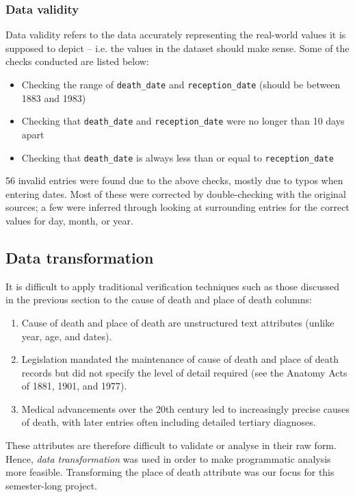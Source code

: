 \subsubsection{Data validity}

Data validity refers to the data accurately representing the real-world values it is supposed to depict -- i.e. the values in the dataset should make sense. Some of the checks conducted are listed below:
\begin{itemize}
    \item Checking the range of \texttt{death\_date} and \texttt{reception\_date} (should be between 1883 and 1983)
    \item Checking that \texttt{death\_date} and \texttt{reception\_date} were no longer than 10 days apart
    \item Checking that \texttt{death\_date} is always less than or equal to \texttt{reception\_date}
\end{itemize}

56 invalid entries were found due to the above checks, mostly due to typos when entering dates. Most of these were corrected by double-checking with the original sources; a few were inferred through looking at surrounding entries for the correct values for day, month, or year.

\subsection{Data transformation}

It is difficult to apply traditional verification techniques such as those discussed in the previous section to the cause of death and place of death columns:

\begin{enumerate}
\item Cause of death and place of death are unstructured text attributes (unlike year, age, and dates).
\item Legislation mandated the maintenance of cause of death and place of death records but did not specify the level of detail required (see the Anatomy Acts of 1881, 1901, and 1977).
\item Medical advancements over the 20th century led to increasingly precise causes of death, with later entries often including detailed tertiary diagnoses.
\end{enumerate}

These attributes are therefore difficult to validate or analyse in their raw form. Hence, \textit{data transformation} was used in order to make programmatic analysis more feasible. Transforming the place of death attribute was our focus for this semester-long project.

